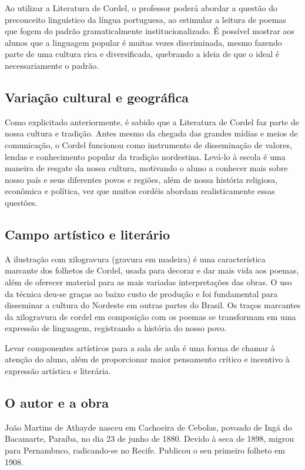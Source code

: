 \documentclass{extarticle}
\begin{document}
Ao utilizar a Literatura de Cordel, o professor poderá abordar a questão
do preconceito linguístico da língua portuguesa, ao estimular a leitura
de poemas que fogem do padrão gramaticalmente institucionalizado. É
possível mostrar aos alunos que a linguagem popular é muitas vezes
discriminada, mesmo fazendo parte de uma cultura rica e diversificada,
quebrando a ideia de que o ideal é necessariamente o padrão.

\subsection{Variação cultural e geográfica}

Como explicitado anteriormente, é sabido que a Literatura de Cordel faz
parte de nossa cultura e tradição. Antes mesmo da chegada das grandes
mídias e meios de comunicação, o Cordel funcionou como instrumento de
disseminação de valores, lendas e conhecimento popular da tradição
nordestina. Levá-lo à escola é uma maneira de resgate da nossa cultura,
motivando o aluno a conhecer mais sobre nosso país e seus diferentes
povos e regiões, além de nossa história religiosa, econômica e política,
vez que muitos cordéis abordam realisticamente essas questões.

\subsection{Campo artístico e literário}

A ilustração com xilogravura (gravura em madeira) é uma característica
marcante dos folhetos de Cordel, usada para decorar e dar mais vida aos
poemas, além de oferecer material para as mais variadas interpretações
das obras. O uso da técnica deu-se graças ao baixo custo de produção e
foi fundamental para disseminar a cultura do Nordeste em outras partes
do Brasil. Os traços marcantes da xilogravura de cordel em composição
com os poemas se transformam em uma expressão de linguagem, registrando
a história do nosso povo.

Levar componentes artísticos para a sala de aula é uma forma de chamar à
atenção do aluno, além de proporcionar maior pensamento crítico e
incentivo à expressão artística e literária.

\subsection{O autor e a obra}

João Martins de Athayde nasceu em Cachoeira de Cebolas, povoado de Ingá
do Bacamarte, Paraíba, no dia 23 de junho de 1880. Devido à seca de
1898, migrou para Pernambuco, radicando-se no Recife. Publicou o seu
primeiro folheto em 1908.
\end{document}
